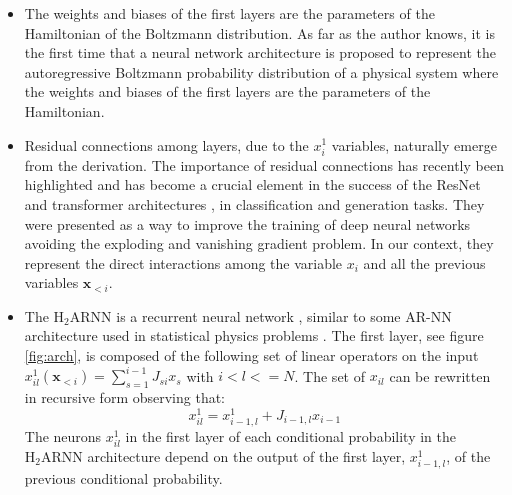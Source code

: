 \documentclass[aps,physrev,10pt,floatfix,reprint]{revtex4-2}
\begin{document}
\begin{itemize}
    \item The weights and biases of the first layers are the parameters of the Hamiltonian of the Boltzmann distribution.  As far as the author knows, it is the first time that a neural network architecture is proposed to represent the autoregressive Boltzmann probability distribution of a physical system where the weights and biases of the first layers are the parameters of the Hamiltonian. 
    \item Residual connections among layers, due to the $x_i^1$ variables, naturally emerge from the derivation. 
    The importance of residual connections has recently been highlighted  \cite{10.48550/arxiv.1512.03385} and has become a crucial element in the success of the ResNet and transformer architectures \cite{vaswani2017attention}, in classification and generation tasks. They were presented as a way to improve the training of deep neural networks avoiding the exploding and vanishing gradient problem. In our context, they represent the direct interactions among the variable $x_i$ and all the previous variables $\mathbf{x}_{<i}$. 

    \item The $\text{H}_2\text{ARNN}$ is a recurrent neural network \cite{bengioNatureDeepLearning2015, https://doi.org/10.48550/arxiv.1506.00019}, similar to some AR-NN architecture used in statistical physics problems \cite{10.1038/s42256-021-00401-3, PhysRevResearch.2.023358}. 
    The first layer, see figure \ref{fig:arch}, is composed of the following set of linear operators on the input $x^1_{il}(\mathbf{x}_{<i})=\sum_{s=1}^{i-1} J_{si} x_s$ with $i<l<=N$. The set of $x_{il}$ can be rewritten in recursive form observing that:
    \begin{equation}
        x^1_{il} = x^1_{i-1,l} + J_{i-1,l} x_{i-1}
    \end{equation}
    The neurons $x^1_{il}$ in the first layer of each conditional probability in the $\text{H}_2\text{ARNN}$ architecture depend on the output of the first layer, $x^1_{i-1,l}$, of the previous conditional probability.
\end{itemize}
\end{document}

